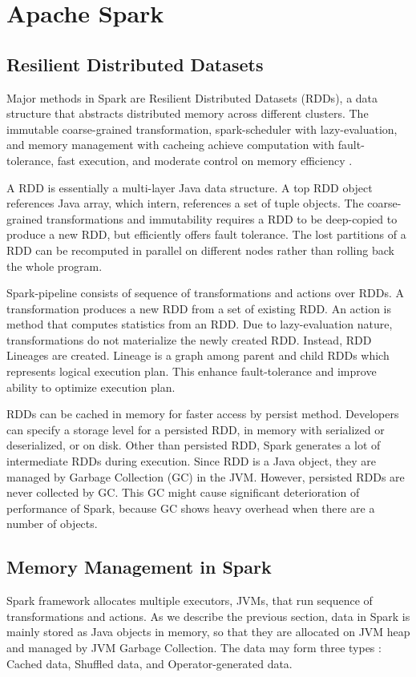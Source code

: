 \section{Apache Spark}
\label{sec:history}
\subsection{Resilient Distributed Datasets}
Major methods in Spark are Resilient Distributed Datasets (RDDs), a data structure that abstracts distributed memory across different clusters. 
The immutable coarse-grained transformation, spark-scheduler with lazy-evaluation, and memory management with cacheing achieve computation with fault-tolerance, 
fast execution, and moderate control on memory efficiency \cite{DBLP:conf/nsdi/ZahariaCDDMMFSS12}.

A RDD is essentially a multi-layer Java data structure. A top RDD object references Java array, which intern, references a set of tuple objects. 
The coarse-grained transformations and immutability requires a RDD to be deep-copied to produce a new RDD, but efficiently offers fault tolerance. 
The lost partitions of a RDD can be recomputed in parallel on different nodes rather than rolling back the whole program.

Spark-pipeline consists of sequence of transformations and actions over RDDs. A transformation produces a new RDD from a set of existing RDD. 
An action is method that computes statistics from an RDD. Due to lazy-evaluation nature, transformations do not materialize the newly created RDD. 
Instead, RDD Lineages are created. Lineage is a graph among parent and child RDDs which represents logical execution plan. 
This enhance fault-tolerance and improve ability to optimize execution plan. 

RDDs can be cached in memory for faster access by persist method. Developers can specify a storage level for a persisted RDD, in memory with serialized or deserialized, or on disk. 
Other than persisted RDD, Spark generates a lot of intermediate RDDs during execution. Since RDD is a Java object, they are managed by Garbage Collection (GC) in the JVM. 
However, persisted RDDs are never collected by GC. This GC might cause significant deterioration of performance of Spark, because GC shows heavy overhead when there are a number of objects.


\subsection{Memory Management in Spark}
Spark framework allocates multiple executors, JVMs, that run sequence of transformations and actions. As we describe the previous section, data in Spark is mainly stored as Java objects in memory, 
so that they are allocated on JVM heap and managed by JVM Garbage Collection. The data may form three types \cite{DBLP:journals/pvldb/XuGDWW19}: Cached data, Shuffled data, and Operator-generated data. 

